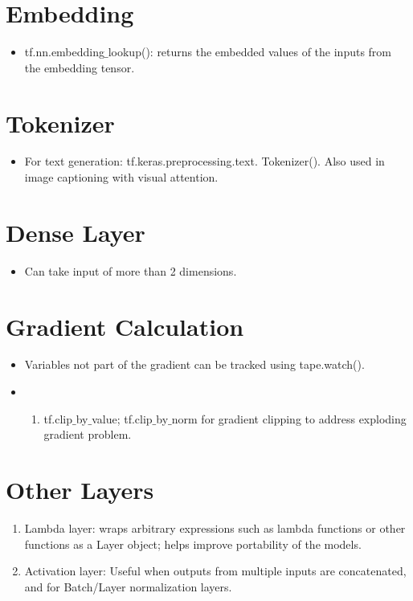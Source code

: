 \documentclass[11pt]{article}
\begin{document}
\begin{multicols*}{2}
\section{Embedding}
\begin{itemize}
\item tf.nn.embedding$\_$lookup(): returns the embedded values of the inputs from the embedding tensor.
\end{itemize}

\section{Tokenizer}
\begin{itemize}
\item For text generation: tf.keras.preprocessing.text. Tokenizer(). Also used in image captioning with visual attention.
\end{itemize}

\section{Dense Layer}
\begin{itemize}
\item Can take input of more than 2 dimensions.
\end{itemize}

\section{Gradient Calculation}
\begin{itemize}
  \item Variables not part of the gradient can be tracked using tape.watch().
  \item \begin{enumerate}
    \item tf.clip$\_$by$\_$value; tf.clip$\_$by$\_$norm for gradient clipping to address exploding gradient problem.
  \end{enumerate}
\end{itemize}

\section{Other Layers}
\begin{enumerate}
\item Lambda layer: wraps arbitrary expressions such as lambda functions or other functions as a Layer object; helps improve portability of the models.
\item Activation layer: Useful when outputs from multiple inputs are concatenated, and for Batch/Layer normalization layers.
\end{enumerate}


\end{multicols*}
\end{document}
